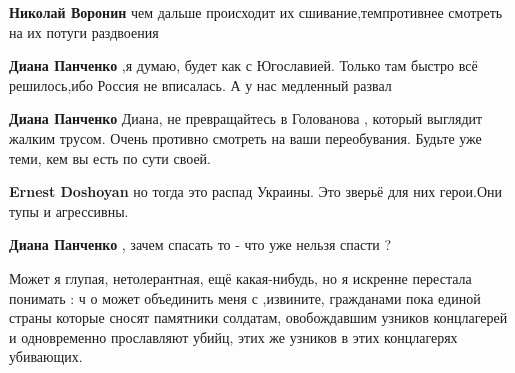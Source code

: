 \begin{itemize}
\begin{itemize}
\textbf{Николай Воронин} чем дальше происходит их сшивание,темпротивнее смотреть на их потуги раздвоения

 
\textbf{Диана Панченко} ,я думаю, будет как с Югославией. Только там быстро всё решилось,ибо Россия не вписалась. А у нас медленный развал

 
\textbf{Диана Панченко}
Диана, не превращайтесь в
Голованова , который выглядит жалким трусом.
Очень противно смотреть на ваши переобувания.
Будьте уже теми, кем вы есть по сути своей.

 
\textbf{Ernest Doshoyan} но тогда это распад Украины. Это зверьё для них герои.Они тупы и агрессивны.

 
\textbf{Диана Панченко} , зачем спасать то - что уже нельзя спасти ?

 

Может я глупая, нетолерантная, ещё какая-нибудь, но я искренне перестала
понимать : ч о может объединить меня с ,извините, гражданами пока единой страны
которые сносят памятники солдатам, овобождавшим узников концлагерей и
одновременно прославляют убийц, этих же узников в этих концлагерях убивающих.


\end{itemize}
\end{itemize}
